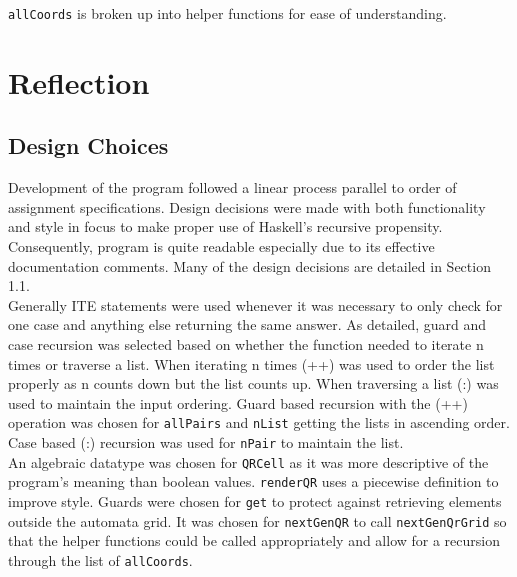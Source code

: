 \documentclass[11pt]{article}
\begin{document}
  \verb|allCoords| is broken up into helper functions for ease of understanding.



\section{Reflection}
    \subsection{Design Choices}
   Development of the program followed a linear process parallel to order of assignment specifications.  Design decisions were made with both functionality and style in focus to make proper use of Haskell's recursive propensity. Consequently, program is quite readable especially due to its effective documentation comments. Many of the design decisions are detailed in Section 1.1.\\
   
   Generally ITE statements were used whenever it was necessary to only check for one case and anything else returning the same answer. As detailed, guard and case recursion was selected based on whether the function needed to iterate n times or traverse a list. When iterating n times (++) was used to order the list properly as n counts down but the list counts up. When traversing a list (:) was used to maintain the input ordering. Guard based recursion with the (++) operation was chosen for \verb|allPairs| and \verb|nList| getting the lists in ascending order. Case based (:) recursion was used for \verb|nPair| to maintain the list. \\
   
   An algebraic datatype was chosen for \verb|QRCell| as it was more descriptive of the program's meaning than boolean values. \verb|renderQR| uses a piecewise definition to improve style. Guards were chosen for \verb|get| to protect against retrieving elements outside the automata grid.  It was chosen for \verb|nextGenQR| to call \verb|nextGenQrGrid| so that the helper functions could be called appropriately and allow for a recursion through the list of \verb|allCoords|.
\end{document}
